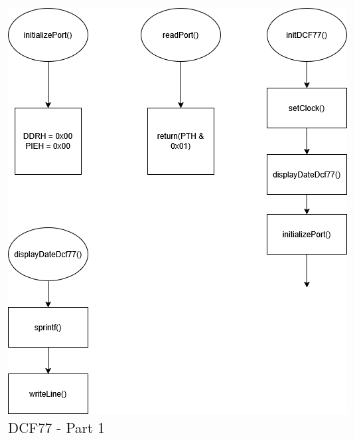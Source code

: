\documentclass[a4paper,12pt]{article}
\begin{document}
\begin{figure}[H]
    \centering
    \includegraphics[width=0.8\textwidth]{diagrams/5.dcf771.png}
    \caption{DCF77 - Part 1}
    \label{fig:DCF77}
\end{figure}
\end{document}
